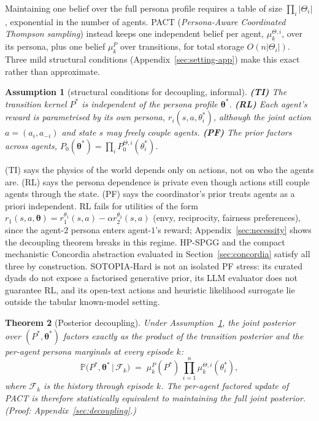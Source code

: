 \documentclass{article}
\newtheorem{theorem}{Theorem}[section]
\newtheorem{assumption}[theorem]{Assumption}
\begin{document}
Maintaining one belief over the full persona profile requires a table of size $\prod_i|\Theta_i|$, exponential in the number of agents. PACT (\emph{Persona-Aware Coordinated Thompson sampling}) instead keeps one independent belief per agent, $\mu^{\Theta,i}_k$, over its persona, plus one belief $\mu^P_k$ over transitions, for total storage $O(n|\Theta_i|)$. Three mild structural conditions (Appendix~\ref{sec:setting-app}) make this exact rather than approximate.

\begin{assumption}[structural conditions for decoupling, informal]
\label{ass:struct}
\textbf{(TI)} The transition kernel $P^*$ is independent of the persona profile $\boldsymbol\theta^*$.
\textbf{(RL)} Each agent's reward is parametrised by its own persona, $r_i(s,a,\theta_i^*)$, although the joint action $a=(a_i,a_{-i})$ and state $s$ may freely couple agents.
\textbf{(PF)} The prior factors across agents, $P_0(\boldsymbol\theta^*)=\prod_i P_0^{\Theta,i}(\theta_i^*)$.
\end{assumption}

(TI) says the physics of the world depends only on actions, not on who the agents are. (RL) says the persona dependence is private even though actions still couple agents through the state. (PF) says the coordinator's prior treats agents as a priori independent. RL fails for utilities of the form $r_1(s,a,\boldsymbol\theta)=r_1^{\theta_1}(s,a)-\alpha r_2^{\theta_2}(s,a)$ (envy, reciprocity, fairness preferences), since the agent-$2$ persona enters agent-$1$'s reward; Appendix~\ref{sec:necessity} shows the decoupling theorem breaks in this regime. HP-SPGG and the compact mechanistic Concordia abstraction evaluated in Section~\ref{sec:concordia} satisfy all three by construction. SOTOPIA-Hard is not an isolated PF stress: its curated dyads do not expose a factorised generative prior, its LLM evaluator does not guarantee RL, and its open-text actions and heuristic likelihood surrogate lie outside the tabular known-model setting.

\begin{theorem}[Posterior decoupling]
\label{thm:decoupling-main}
Under Assumption~\ref{ass:struct}, the joint posterior over $(P^*, \boldsymbol\theta^*)$ factors exactly as the product of the transition posterior and the per-agent persona marginals at every episode $k$:
\begin{equation}
\label{eq:decoupling}
\mathbb{P}\!\big(P^*, \boldsymbol\theta^*\,\big|\,\mathcal{F}_k\big)
\;=\;\mu^P_k(P^*)\,\prod_{i=1}^{n}\mu^{\Theta,i}_k(\theta_i^*),
\end{equation}
where $\mathcal{F}_k$ is the history through episode $k$. The per-agent factored update of PACT is therefore statistically equivalent to maintaining the full joint posterior. (Proof: Appendix~\ref{sec:decoupling}.)
\end{theorem}
\end{document}
